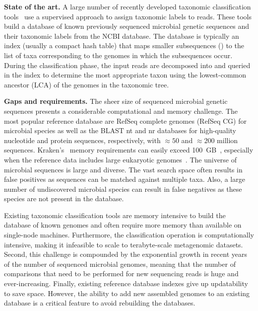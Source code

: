 \noindent
\textbf{State of the art.}
A large number of recently developed taxonomic classification tools~\cite{ames2013scalable, kim2016centrifuge, menzel2016fast, wood2014kraken, wood2019improved, dilthey2019strain,liu2018novel} use a supervised approach to assign taxonomic labels to reads.
These tools build a database of known previously sequenced microbial genetic sequences and their taxonomic labels from the NCBI database.
The database is typically an index (usually a compact hash table) that maps smaller subsequences (\kmers) to the list of taxa corresponding to the genomes in which the subsequences occur.
During the classification phase, the input reads are decomposed into \kmers and queried in the index to determine the most appropriate taxon using the lowest-common ancestor (LCA) of the genomes in the taxonomic tree.

\noindent
\textbf{Gaps and requirements.}
The sheer size of sequenced microbial genetic sequences presents a considerable computational and memory challenge.
The most popular reference database are RefSeq complete genomes (RefSeq CG) for microbial species as well as the BLAST nt and nr databases for high-quality nucleotide and protein sequences, respectively, with $\approx50$ and $\approx200$ million sequences.
Kraken's~\cite{wood2014kraken} memory requirements can easily exceed 100~GB~\cite{simon2019benchmarking}, especially when the reference data includes large eukaryotic genomes~\cite{meiser2017sequencing, knutson2017porcine}.
%
The universe of microbial sequences is large and diverse. The vast search space often results in false positives as sequences can be matched against multiple taxa. Also, a large number of undiscovered microbial species can result in false negatives as these species are not present in the database.

Existing taxonomic classification tools are memory intensive to build the database of known genomes and often require more memory than available on single-node machines. Furthermore, the classification operation is computationally intensive, making it infeasible to scale to terabyte-scale metagenomic datasets.
Second, this challenge is compounded by the exponential growth in recent years of the number of sequenced microbial genomes, meaning that the number of comparisons that need to be performed for new sequencing reads is huge and ever-increasing.
%
Finally, existing reference database indexes give up updatability to save space. However, the ability to add new assembled genomes to an existing database is a critical feature to avoid rebuilding the databases.


